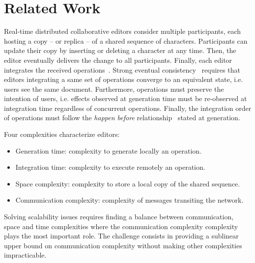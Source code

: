 \section{Related Work}
\label{sec:relatedwork}

Real-time distributed collaborative editors consider multiple participants, each
hosting a copy -- or replica -- of a shared sequence of characters. Participants
can update their copy by inserting or deleting a character at any time. Then,
the editor eventually delivers the change to all participants. Finally, each
editor integrates the received operations~\cite{saito2005optimistic}. Strong
eventual consistency~\cite{bailis2013eventual, shapiro2011comprehensive,
  sun1998achieving} requires that editors integrating a same set of operations
converge to an equivalent state, i.e. users see the same document. Furthermore,
operations must preserve the intention of users, i.e. effects observed at
generation time must be re-observed at integration time regardless of concurrent
operations. Finally, the integration order of operations must follow the
\emph{happen before} relationship~\cite{lamport1978time} stated at generation.

\noindent Four complexities characterize editors:
\begin{itemize}[noitemsep, leftmargin=*]
\item Generation time: complexity to generate locally an operation.
\item Integration time: complexity to execute remotely an operation.
\item Space complexity: complexity to store a local copy of the shared sequence.
\item Communication complexity: complexity of messages transiting the network.
\end{itemize}
Solving scalability issues requires finding a balance between communication,
space and time complexities %
where the communication complexity complexity plays the most important role. The
challenge consists in providing a sublinear upper bound on communication
complexity without making other complexities impracticable.


